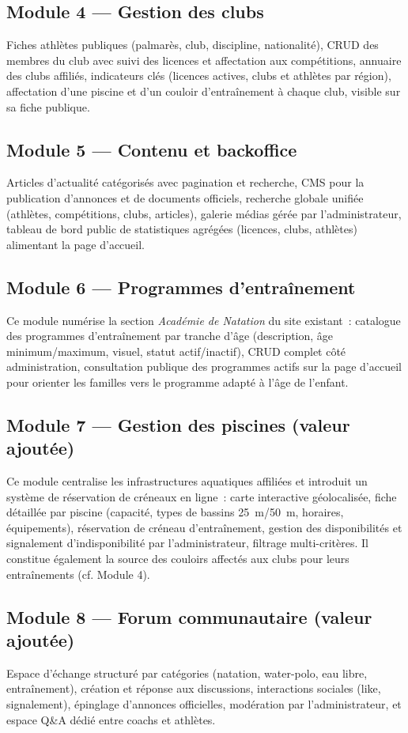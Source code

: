 \documentclass[conference]{IEEEtran}
\begin{document}
\subsection{Module 4 — Gestion des clubs}
Fiches athlètes publiques (palmarès, club, discipline, nationalité), CRUD des membres du club avec suivi des licences et affectation aux compétitions, annuaire des clubs affiliés, indicateurs clés (licences actives, clubs et athlètes par région), affectation d'une piscine et d'un couloir d'entraînement à chaque club, visible sur sa fiche publique.

\subsection{Module 5 — Contenu et backoffice}
Articles d'actualité catégorisés avec pagination et recherche, CMS pour la publication d'annonces et de documents officiels, recherche globale unifiée (athlètes, compétitions, clubs, articles), galerie médias gérée par l'administrateur, tableau de bord public de statistiques agrégées (licences, clubs, athlètes) alimentant la page d'accueil.

\subsection{Module 6 — Programmes d'entraînement}
Ce module numérise la section \emph{Académie de Natation} du site existant~: catalogue des programmes d'entraînement par tranche d'âge (description, âge minimum/maximum, visuel, statut actif/inactif), CRUD complet côté administration, consultation publique des programmes actifs sur la page d'accueil pour orienter les familles vers le programme adapté à l'âge de l'enfant.

\subsection{Module 7 — Gestion des piscines (valeur ajoutée)}
Ce module centralise les infrastructures aquatiques affiliées et introduit un système de réservation de créneaux en ligne~: carte interactive géolocalisée, fiche détaillée par piscine (capacité, types de bassins 25~m/50~m, horaires, équipements), réservation de créneau d'entraînement, gestion des disponibilités et signalement d'indisponibilité par l'administrateur, filtrage multi-critères. Il constitue également la source des couloirs affectés aux clubs pour leurs entraînements (cf. Module 4).

\subsection{Module 8 — Forum communautaire (valeur ajoutée)}
Espace d'échange structuré par catégories (natation, water-polo, eau libre, entraînement), création et réponse aux discussions, interactions sociales (like, signalement), épinglage d'annonces officielles, modération par l'administrateur, et espace Q\&A dédié entre coachs et athlètes.
\end{document}
